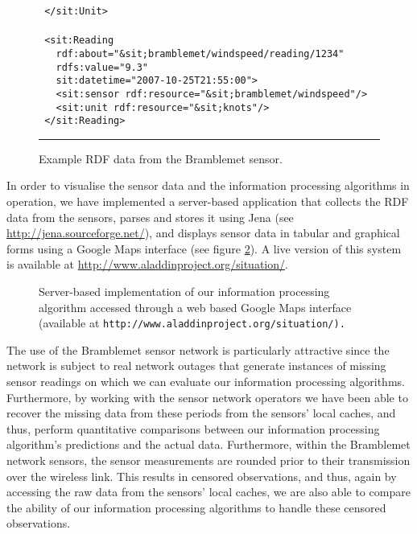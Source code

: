 \documentclass{acmtrans2m}
\begin{document}
\begin{figure}
\begin{minipage}{2.6in}
\begin{tabbing}
\tt\scriptsize \ </\color{red}sit:Unit\color{black}>\\
\\
\tt\scriptsize \ <\color{red}sit:Reading\color{black}\\
\tt\scriptsize \ \ \ rdf:about=\color{blue}"\&sit;bramblemet/windspeed/reading/1234"\color{black}\\
\tt\scriptsize \ \ \ rdfs:value=\color{blue}"9.3"\color{black}\\
\tt\scriptsize \ \ \ sit:datetime=\color{blue}"2007-10-25T21:55:00"\color{black}>\\
\tt\scriptsize \ \ \ <\color{red}sit:sensor\color{black}~rdf:resource=\color{blue}"\&sit;bramblemet/windspeed"\color{black}/>\\
\tt\scriptsize \ \ \ <\color{red}sit:unit\color{black}~rdf:resource=\color{blue}"\&sit;knots"\color{black}/>\\
\tt\scriptsize \ </\color{red}sit:Reading\color{black}>\\
\normalsize
\end{tabbing}
\end{minipage}\par
\rule{3.3in}{.005in} 
\caption{Example RDF data from the Bramblemet sensor.}
\label{rdf}
\end{figure}

In order to visualise the sensor data and the information processing algorithms in operation, we have implemented a server-based application that collects the RDF data from the sensors, parses and stores it using Jena (see \url{http://jena.sourceforge.net/}), and displays sensor data in tabular and graphical forms using a Google Maps interface (see figure \ref{screen}). A live version of this system is available at \url{http://www.aladdinproject.org/situation/}.

\begin{figure}[htp]
\begin{center}
\caption{Server-based implementation of our information processing algorithm accessed through a web based Google Maps interface (available at \tt{http://www.aladdinproject.org/situation/}).}
\label{screen}
\end{center}
\end{figure}

The use of the Bramblemet sensor network is particularly attractive since the network is subject to real network outages that generate instances of missing sensor readings on which we can evaluate our information processing algorithms. Furthermore, by working with the sensor network operators we have been able to recover the missing data from these periods from the sensors' local caches, and thus, perform quantitative comparisons between our information processing algorithm's predictions and the actual data. Furthermore, within the Bramblemet network sensors, the sensor measurements are rounded prior to their transmission over the wireless link. This results in censored observations, and thus, again by accessing the raw data from the sensors' local caches, we are also able to compare the ability of our information processing algorithms to handle these censored observations.
\end{document}
